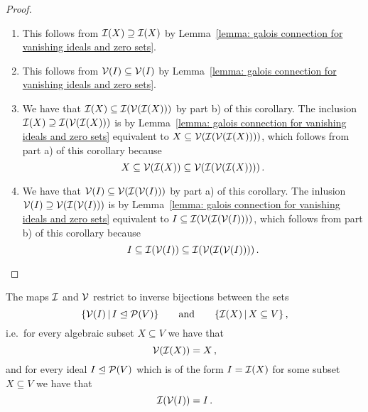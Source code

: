 \begin{proof}
  \leavevmode
  \begin{enumerate}
    \item
      This follows from $\mathcal{I}(X) \supseteq \mathcal{I}(X)$ by Lemma~\ref{lemma: galois connection for vanishing ideals and zero sets}.
    \item
      This follows from $\mathcal{V}(I) \subseteq \mathcal{V}(I)$ by Lemma~\ref{lemma: galois connection for vanishing ideals and zero sets}.
    \item
      We have that $\mathcal{I}(X) \subseteq \mathcal{I}(\mathcal{V}(\mathcal{I}(X)))$ by part b) of this corollary.
      The inclusion $\mathcal{I}(X) \supseteq \mathcal{I}(\mathcal{V}(\mathcal{I}(X)))$ is by Lemma~\ref{lemma: galois connection for vanishing ideals and zero sets} equivalent to $X \subseteq \mathcal{V}(\mathcal{I}(\mathcal{V}(\mathcal{I}(X))))$, which follows from part a) of this corollary because
      \[
                  X
        \subseteq \mathcal{V}(\mathcal{I}(X))
        \subseteq \mathcal{V}(\mathcal{I}(\mathcal{V}(\mathcal{I}(X)))) \,.
      \]
    \item
      We have that $\mathcal{V}(I) \subseteq \mathcal{V}(\mathcal{I}(\mathcal{V}(I)))$ by part a) of this corollary.
      The inlusion $\mathcal{V}(I) \supseteq \mathcal{V}(\mathcal{I}(\mathcal{V}(I)))$ is by Lemma~\ref{lemma: galois connection for vanishing ideals and zero sets} equivalent to $I \subseteq \mathcal{I}(\mathcal{V}(\mathcal{I}(\mathcal{V}(I))))$, which follows from part b) of this corollary because
      \[
                  I
        \subseteq \mathcal{I}(\mathcal{V}(I))
        \subseteq \mathcal{I}(\mathcal{V}(\mathcal{I}(\mathcal{V}(I)))) \,.
        \qedhere
      \]
  \end{enumerate}
\end{proof}


\begin{corollary}
  \label{corollary: bijection induced by Galois correspondence}
  The maps $\mathcal{I}$ and $\mathcal{V}$ restrict to inverse bijections between the sets
  \[
    \{ \mc{V}(I) \suchthat I \idealeq \mc{P}(V)  \}
    \qquad\text{and}\qquad
    \{ \mc{I}(X) \suchthat X \subseteq V \} \,,
  \]
  i.e.\ for every algebraic subset $X \subseteq V$ we have that
  \[
    \mathcal{V}(\mathcal{I}(X)) = X \,,
  \]
  and for every ideal $I \trianglelefteq \mathcal{P}(V)$ which is of the form $I = \mathcal{I}(X)$ for some subset $X \subseteq V$ we have that
  \[
    \mathcal{I}(\mathcal{V}(I)) = I \,.
  \]
\end{corollary}


